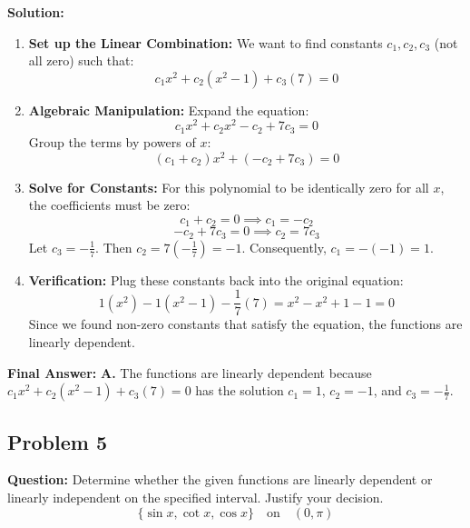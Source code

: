 \documentclass[11pt, a4paper]{article}
\theoremstyle{definition}
\theoremstyle{remark}
\begin{document}
\textbf{Solution:}
\begin{enumerate}
    \item \textbf{Set up the Linear Combination:} We want to find constants $c_1, c_2, c_3$ (not all zero) such that:
    \[ c_1 x^2 + c_2(x^2 - 1) + c_3(7) = 0 \]
    \item \textbf{Algebraic Manipulation:} Expand the equation:
    \[ c_1 x^2 + c_2 x^2 - c_2 + 7c_3 = 0 \]
    Group the terms by powers of $x$:
    \[ (c_1 + c_2)x^2 + (-c_2 + 7c_3) = 0 \]
    \item \textbf{Solve for Constants:} For this polynomial to be identically zero for all $x$, the coefficients must be zero:
    \[ c_1 + c_2 = 0 \implies c_1 = -c_2 \]
    \[ -c_2 + 7c_3 = 0 \implies c_2 = 7c_3 \]
    Let $c_3 = -\frac{1}{7}$. Then $c_2 = 7\left(-\frac{1}{7}\right) = -1$. Consequently, $c_1 = -(-1) = 1$.
    \item \textbf{Verification:} Plug these constants back into the original equation:
    \[ 1(x^2) - 1(x^2 - 1) - \frac{1}{7}(7) = x^2 - x^2 + 1 - 1 = 0 \]
    Since we found non-zero constants that satisfy the equation, the functions are linearly dependent.
\end{enumerate}
\textbf{Final Answer:} \textbf{A.} The functions are linearly dependent because $c_1 x^2 + c_2(x^2 - 1) + c_3(7) = 0$ has the solution $c_1 = 1$, $c_2 = -1$, and $c_3 = -\frac{1}{7}$.

\vspace{1em}
\subsection{Problem 5}
\textbf{Question:} Determine whether the given functions are linearly dependent or linearly independent on the specified interval. Justify your decision.
\[ \{\sin x, \cot x, \cos x\} \quad \text{on} \quad (0, \pi) \]
\end{document}
